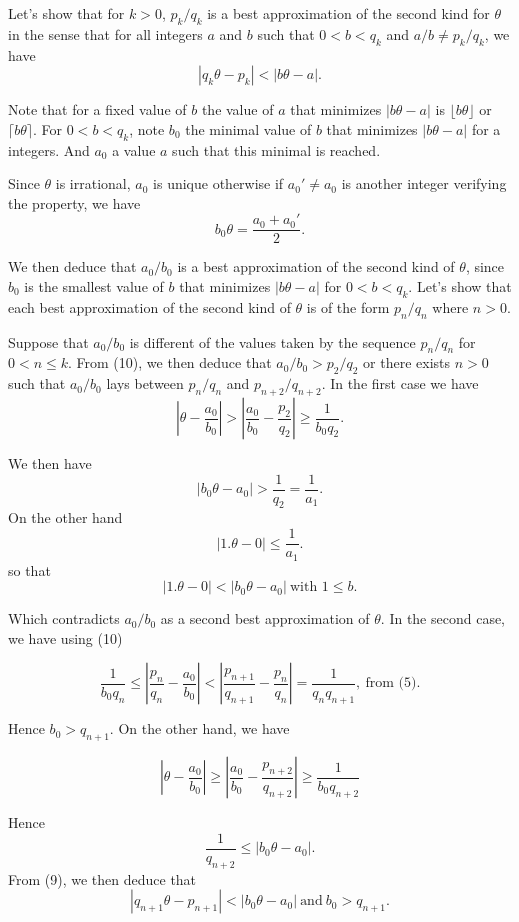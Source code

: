 \documentclass[a4paper,12pt]{article}
\begin{document}
Let's show that for $k> 0$, $p_k/q_k$ is a best approximation of the
second kind for $\theta$ in the sense that for all integers $a$ and
$b$ such that $0 < b < q_k$ and $a/b \not= p_k/q_k$, we have
\[ |q_k \theta - p_k| < |b \theta - a|.\]

Note that for a fixed value of $b$ the value of $a$ that minimizes $|b
\theta - a|$ is $\lfloor b \theta\rfloor$ or $\lceil b \theta\rceil$.
For $0 < b < q_k$, note $b_0$ the minimal value of $b$ that minimizes
$|b\theta-a|$ for a integers.  And $a_0$ a value $a$ such that this
minimal is reached.

Since $\theta$ is irrational, $a_0$ is unique otherwise if $a_0' \not=
a_0$ is another integer verifying the property, we have
\[ b_0\theta = \frac{a_0 + a_0'}{2}.\]

We then deduce that $a_0/b_0$ is a best approximation of the second
kind of $\theta$, since $b_0$ is the smallest value of $b$ that
minimizes $|b\theta - a|$ for $0 < b < q_k$.  Let's show that each
best approximation of the second kind of $\theta$ is of the form
$p_n/q_n$ where $n>0$.

Suppose that $a_0/b_0$ is different of the values taken by the
sequence $p_n/q_n$ for $0<n\le k$.  From (10), we then deduce that
$a_0/b_0 > p_2/q_2$ or there exists $n>0$ such that $a_0/b_0$ lays
between $p_n/q_n$ and $p_{n+2}/q_{n+2}$.  In the first case we have
\[ \left| \theta - \frac{a_0}{b_0} \right| > \left| \frac{a_0}{b_0} -
\frac{p_2}{q_2}\right| \ge \frac{1}{b_0 q_2}.\]

We then have
\[ |b_0\theta - a_0| > \frac{1}{q_2} = \frac{1}{a_1}.\]
On the other hand
\[ |1.\theta - 0 | \le \frac{1}{a_1}.\]
so that
\[ |1. \theta - 0| < |b_0 \theta - a_0|\ \mbox{with $1\le b$}.\]

Which contradicts $a_0/b_0$ as a second best approximation of
$\theta$. In the second case, we have using (10)

\[ \frac{1}{b_0q_n}\le \left|\frac{p_n}{q_n} - \frac{a_0}{b_0}\right| <
\left|\frac{p_{n+1}}{q_{n+1}} - \frac{p_n}{q_n}\right| =
\frac{1}{q_nq_{n+1}},\ \mbox{from (5)}.\]

Hence $b_0 > q_{n+1}$.  On the other hand, we have

\[ \left| \theta - \frac{a_0}{b_0} \right| \ge \left|
\frac{a_0}{b_0} - \frac{p_{n+2}}{q_{n+2}}\right| \ge
\frac{1}{b_0 q_{n+2}}\]

Hence \[ \frac{1}{q_{n+2}} \le |b_0 \theta - a_0|.\]
From (9), we then deduce that
\[ |q_{n+1}\theta - p_{n+1}| < |b_0\theta - a_0|\ \mbox{and}\ b_0>q_{n+1}.\]
\end{document}
